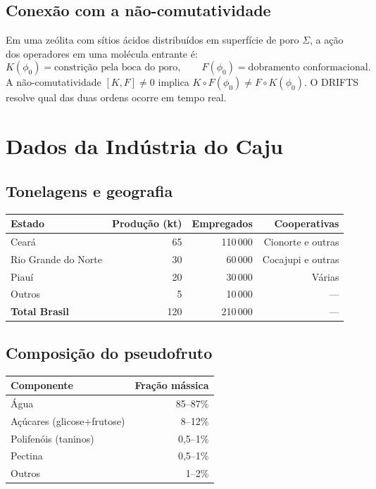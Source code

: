 \documentclass[12pt,a4paper,twoside]{book}
\theoremstyle{plain}
\theoremstyle{definition}
\theoremstyle{definition}
\begin{document}
\section{Conexão com a não-comutatividade}

Em uma zeólita com sítios ácidos distribuídos em superfície de poro
$\Sigma$, a ação dos operadores em uma molécula entrante é:
\[
  K(\phi_{0}) = \text{constrição pela boca do poro}, \qquad
  F(\phi_{0}) = \text{dobramento conformacional}.
\]
A não-comutatividade $[K,F] \ne 0$ implica
$K \circ F (\phi_{0}) \ne F \circ K (\phi_{0})$. O DRIFTS resolve qual
das duas ordens ocorre em tempo real.

\chapter{Dados da Indústria do Caju}
\label{ap:caju-dados}

\section{Tonelagens e geografia}

\begin{tabular}{lrrr}
\toprule
\textbf{Estado} & \textbf{Produção (kt)} & \textbf{Empregados} & \textbf{Cooperativas} \\
\midrule
Ceará               & 65  & 110\,000 & Cionorte e outras \\
Rio Grande do Norte & 30  &  60\,000 & Cocajupi e outras \\
Piauí               & 20  &  30\,000 & Várias \\
Outros              &  5  &  10\,000 & --- \\
\midrule
\textbf{Total Brasil} & 120 & 210\,000 & --- \\
\bottomrule
\end{tabular}

\section{Composição do pseudofruto}

\begin{tabular}{lr}
\toprule
\textbf{Componente} & \textbf{Fração mássica} \\
\midrule
Água                       & 85--87\% \\
Açúcares (glicose+frutose) & 8--12\% \\
Polifenóis (taninos)       & 0,5--1\% \\
Pectina                    & 0,5--1\% \\
Outros                     & 1--2\% \\
\bottomrule
\end{tabular}
\end{document}
